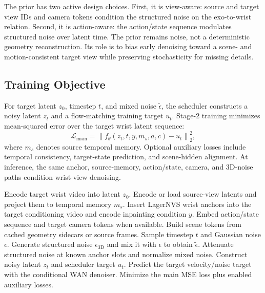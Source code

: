 \documentclass[letterpaper]{article}
\begin{document}
The prior has two active design choices.
First, it is view-aware: source and target view IDs and camera tokens condition the structured noise on the exo-to-wrist relation.
Second, it is action-aware: the action/state sequence modulates structured noise over latent time.
The prior remains noise, not a deterministic geometry reconstruction.
Its role is to bias early denoising toward a scene- and motion-consistent target view while preserving stochasticity for missing details.

\subsection{Training Objective}

For target latent $z_0$, timestep $t$, and mixed noise $\tilde{\epsilon}$, the scheduler constructs a noisy latent $z_t$ and a flow-matching training target $u_t$.
Stage-2 training minimizes mean-squared error over the target wrist latent sequence:
\[
    \mathcal{L}_{\mathrm{main}} =
    \left\| f_{\theta}(z_t, t, y, m_s, a, c) - u_t \right\|_2^2,
\]
where $m_s$ denotes source temporal memory.
Optional auxiliary losses include temporal consistency, target-state prediction, and scene-hidden alignment.
At inference, the same anchor, source-memory, action/state, camera, and 3D-noise paths condition wrist-view denoising.

\begin{algorithm}[t]
\caption{Guarded Stage-2 Training Step}
\label{alg:train}
\begin{algorithmic}[1]
\STATE Encode target wrist video into latent $z_0$.
\STATE Encode or load source-view latents and project them to temporal memory $m_s$.
\STATE Insert LagerNVS wrist anchors into the target conditioning video and encode inpainting condition $y$.
\STATE Embed action/state sequence and target camera tokens when available.
\STATE Build scene tokens from cached geometry sidecars or source frames.
\STATE Sample timestep $t$ and Gaussian noise $\epsilon$.
\STATE Generate structured noise $\epsilon_{\mathrm{3D}}$ and mix it with $\epsilon$ to obtain $\tilde{\epsilon}$.
\STATE Attenuate structured noise at known anchor slots and normalize mixed noise.
\STATE Construct noisy latent $z_t$ and scheduler target $u_t$.
\STATE Predict the target velocity/noise target with the conditional WAN denoiser.
\STATE Minimize the main MSE loss plus enabled auxiliary losses.
\end{algorithmic}
\end{algorithm}
\end{document}
